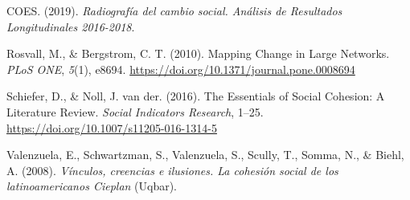 \documentclass[
  12pt,
]{book}
\begin{document}
\leavevmode\hypertarget{ref-coes_radiografia_2019}{}%
COES. (2019). \emph{Radiografía del cambio social. Análisis de Resultados Longitudinales 2016-2018}.

\leavevmode\hypertarget{ref-rosvall_mapping_2010}{}%
Rosvall, M., \& Bergstrom, C. T. (2010). Mapping Change in Large Networks. \emph{PLoS ONE}, \emph{5}(1), e8694. \url{https://doi.org/10.1371/journal.pone.0008694}

\leavevmode\hypertarget{ref-schiefer_essentials_2016}{}%
Schiefer, D., \& Noll, J. van der. (2016). The Essentials of Social Cohesion: A Literature Review. \emph{Social Indicators Research}, 1--25. \url{https://doi.org/10.1007/s11205-016-1314-5}

\leavevmode\hypertarget{ref-valenzuela_vinculos_2008}{}%
Valenzuela, E., Schwartzman, S., Valenzuela, S., Scully, T., Somma, N., \& Biehl, A. (2008). \emph{Vínculos, creencias e ilusiones. La cohesión social de los latinoamericanos Cieplan} (Uqbar).
\end{document}
